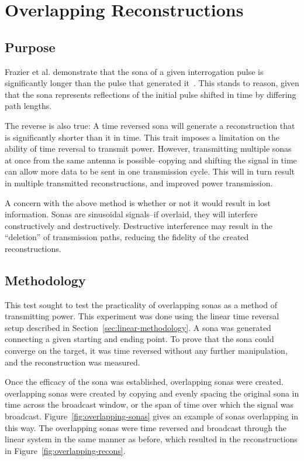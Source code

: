 \chapter{Overlapping Reconstructions}
\label{ch:overlapping}

\section{Purpose}
\label{sec:overlapping-purpose}

Frazier et al. demonstrate that the sona of a given interrogation pulse is significantly longer than the pulse that generated it~\cite{nltr-wave-chaotic}. This stands to reason, given that the sona represents reflections of the initial pulse shifted in time by differing path lengths.

The reverse is also true: A time reversed sona will generate a reconstruction that is significantly shorter than it in time. This trait imposes a limitation on the ability of time reversal to transmit power. However, transmitting multiple sonas at once from the same antenna is possible--copying and shifting the signal in time can allow more data to be sent in one transmission cycle. This will in turn result in multiple transmitted reconstructions, and improved power transmission.

A concern with the above method is whether or not it would result in lost information. Sonas are sinusoidal signals--if overlaid, they will interfere constructively and destructively. Destructive interference may result in the ``deletion'' of transmission paths, reducing the fidelity of the created reconstructions.

\section{Methodology}
\label{sec:overlapping-meth}

This test sought to test the practicality of overlapping sonas as a method of transmitting power. This experiment was done using the linear time reversal setup described in Section~\ref{sec:linear-methodology}. A sona was generated connecting a given starting and ending point. To prove that the sona could converge on the target, it was time reversed without any further manipulation, and the reconstruction was measured.

Once the efficacy of the sona was established, overlapping sonas were created. overlapping sonas were created by copying and evenly spacing the original sona in time across the broadcast window, or the span of time over which the signal was broadcast. Figure~\ref{fig:overlapping-sonas} gives an example of sonas overlapping in this way. The overlapping sonas were time reversed and broadcast through the linear system in the same manner as before, which resulted in the reconstructions in Figure~\ref{fig:overlapping-recons}.

